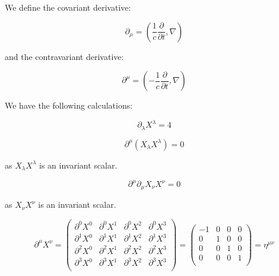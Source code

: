 \documentclass[12pt]{article}
\begin{document}



\pagebreak
\section*{}


We define the covariant derivative:

\begin{equation}
    \partial_{\mu} = \left( \frac{1}{c} \frac{\partial}{\partial t}, \nabla \right)
\end{equation}

and the contravariant derivative:

\begin{equation}
    \partial^{\mu} = \left( -\frac{1}{c} \frac{\partial}{\partial t}, \nabla \right)
\end{equation}

We have the following calculations:

\begin{equation}
    \partial_{\lambda} X^{\lambda} = 4
\end{equation}

\begin{equation}
    \partial^{\mu} (X_{\lambda} X^{\lambda}) = 0
\end{equation}

as $X_{\lambda} X^{\lambda}$ is an invariant scalar.

\begin{equation}
    \partial^{\mu} \partial_{\mu} X_{\nu} X^{\nu} = 0
\end{equation}

as $X_{\nu} X^{\nu}$ is an invariant scalar.

\begin{equation}
    \partial^{\mu} X^{\nu} =
    \begin{pmatrix}
        \partial^{0} X^{0} & \partial^{0} X^{1} & \partial^{0} X^{2} & \partial^{0} X^{3} \\
        \partial^{1} X^{0} & \partial^{1} X^{1} & \partial^{1} X^{2} & \partial^{1} X^{3} \\
        \partial^{2} X^{0} & \partial^{2} X^{1} & \partial^{2} X^{2} & \partial^{2} X^{3} \\
        \partial^{3} X^{0} & \partial^{3} X^{1} & \partial^{3} X^{2} & \partial^{3} X^{3} \\
    \end{pmatrix}
    =
    \begin{pmatrix}
        -1 & 0 & 0 & 0 \\
        0  & 1 & 0 & 0 \\
        0  & 0 & 1 & 0 \\
        0  & 0 & 0 & 1 \\
    \end{pmatrix}
    =
    \eta^{\mu \nu}
\end{equation}
\end{document}
